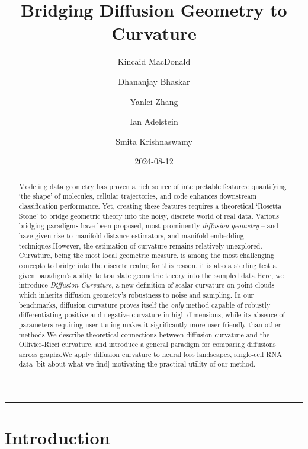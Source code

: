 \documentclass[
  letterpaper,
  DIV=11,
  numbers=noendperiod]{scrartcl}
\title{Bridging Diffusion Geometry to Curvature}
\author{Kincaid MacDonald \and Dhananjay Bhaskar \and Yanlei
Zhang \and Ian Adelstein \and Smita Krishnaswamy}
\date{2024-08-12}
\theoremstyle{plain}
\theoremstyle{definition}
\theoremstyle{plain}
\theoremstyle{definition}
\theoremstyle{plain}
\theoremstyle{remark}
\begin{document}
\maketitle
\begin{abstract}
Modeling data geometry has proven a rich source of interpretable
features: quantifying `the shape' of molecules, cellular trajectories,
and code enhances downstream classification performance. Yet, creating
these features requires a theoretical `Rosetta Stone' to bridge
geometric theory into the noisy, discrete world of real data. Various
bridging paradigms have been proposed, most prominently \emph{diffusion
geometry} -- and have given rise to manifold distance estimators, and
manifold embedding techniques.However, the estimation of curvature
remains relatively unexplored. Curvature, being the most local geometric
measure, is among the most challenging concepts to bridge into the
discrete realm; for this reason, it is also a sterling test a given
paradigm's ability to translate geometric theory into the sampled
data.Here, we introduce \emph{Diffusion Curvature}, a new definition of
scalar curvature on point clouds which inherits diffusion geometry's
robustness to noise and sampling. In our benchmarks, diffusion curvature
proves itself the \emph{only} method capable of robustly differentiating
positive and negative curvature in high dimensions, while its absence of
parameters requiring user tuning makes it significantly more
user-friendly than other methods.We describe theoretical connections
between diffusion curvature and the Ollivier-Ricci curvature, and
introduce a general paradigm for comparing diffusions across graphs.We
apply diffusion curvature to neural loss landscapes, single-cell RNA
data {[}bit about what we find{]} motivating the practical utility of
our method.
\end{abstract}
\begin{center}\rule{0.5\linewidth}{0.5pt}\end{center}

\newcommand\Kaly[1]{\textcolor{blue}{Kaly: [[[#1]]]}}

\section{Introduction}\label{introduction}
\end{document}
